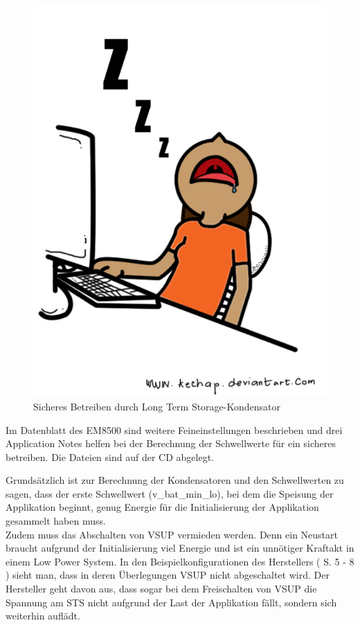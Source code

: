 \begin{figure}
   \includegraphics{Idle.jpg}
   \caption{Sicheres Betreiben durch Long Term Storage-Kondensator}\label{energiespeisung_lts} 
\end{figure}

Im Datenblatt des EM8500 \cite{datasheet_EM85} sind weitere Feineinstellungen beschrieben und drei Application Notes helfen bei der Berechnung der Schwellwerte für ein sicheres betreiben. Die Dateien sind auf der CD abgelegt. 

Grundsätzlich ist zur Berechnung der Kondensatoren und den Schwellwerten zu sagen, dass der erste Schwellwert (v\_bat\_min\_lo), bei dem die Speisung der Applikation beginnt, genug Energie für die Initialisierung der Applikation gesammelt haben muss. \\
Zudem muss das Abschalten von VSUP vermieden werden. Denn ein Neustart braucht aufgrund der Initialisierung viel Energie und ist ein unnötiger Kraftakt in einem Low Power System. In den Beispielkonfigurationen des Herstellers (\cite{datasheet_EM85} S. 5 - 8 ) sieht man, dass in deren Überlegungen VSUP nicht abgeschaltet wird. Der Hersteller geht davon aus, dass sogar bei dem Freischalten von VSUP die Spannung am STS nicht aufgrund der Last der Applikation fällt, sondern sich weiterhin auflädt.

